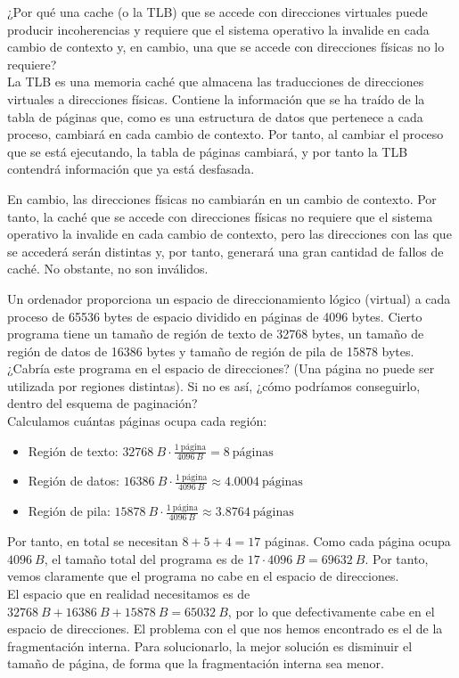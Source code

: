 \begin{ejercicio}
¿Por qué una cache (o la TLB) que se accede con direcciones virtuales puede producir
incoherencias y requiere que el sistema operativo la invalide en cada cambio de
contexto y, en cambio, una que se accede con direcciones físicas no lo requiere?\\

    La TLB es una memoria caché que almacena las traducciones de direcciones virtuales a direcciones físicas.
    Contiene la información que se ha traído de la tabla de páginas que, como es una estructura de datos que pertenece a cada proceso, cambiará en cada cambio de contexto.
    Por tanto, al cambiar el proceso que se está ejecutando, la tabla de páginas cambiará, y por tanto la TLB contendrá información que ya está desfasada.

    En cambio, las direcciones físicas no cambiarán en un cambio de contexto.
    Por tanto, la caché que se accede con direcciones físicas no requiere que el sistema operativo la invalide en cada cambio de contexto,
    pero las direcciones con las que se accederá serán distintas y, por tanto, generará una gran cantidad de fallos de caché.
    No obstante, no son inválidos.
\end{ejercicio}

\begin{ejercicio}
Un ordenador proporciona un espacio de direccionamiento lógico (virtual) a cada
proceso de 65536 bytes de espacio dividido en páginas de 4096 bytes.
Cierto programa tiene un tamaño de región de texto de 32768 bytes, un
tamaño de región de datos de 16386 bytes y tamaño de región de pila de 15878 bytes.
¿Cabría este programa en el espacio de direcciones? (Una página no puede ser utilizada
por regiones distintas). Si no es así, ¿cómo podríamos conseguirlo, dentro del
esquema de paginación?\\

    Calculamos cuántas páginas ocupa cada región:
    \begin{itemize}
        \item Región de texto: $32768~B \cdot \frac{1~\text{página}}{4096~B} = 8~\text{páginas}$
        \item Región de datos: $16386~B \cdot \frac{1~\text{página}}{4096~B} \approx 4.0004~\text{páginas}$
        \item Región de pila: $15878~B \cdot \frac{1~\text{página}}{4096~B} \approx 3.8764~\text{páginas}$
    \end{itemize}

    Por tanto, en total se necesitan $8+5+4=17$ páginas. Como cada página ocupa $4096~B$, el tamaño total del programa es de
    $17\cdot 4096~B = 69632~B$. Por tanto, vemos claramente que el programa no cabe en el espacio de direcciones.\\

    El espacio que en realidad necesitamos es de $32768~B + 16386~B + 15878~B = 65032~B$, por lo que
    defectivamente cabe en el espacio de direcciones. El problema con el que nos hemos encontrado 
    es el de la fragmentación interna. Para solucionarlo, la mejor solución
    es disminuir el tamaño de página, de forma que la fragmentación interna sea menor.
\end{ejercicio}

